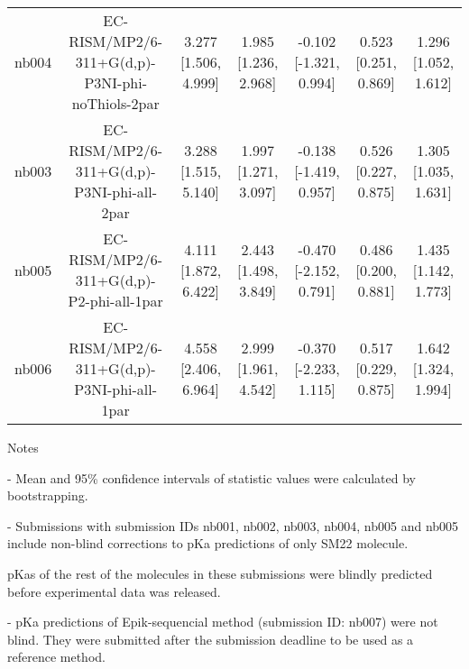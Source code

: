 \documentclass{article}
\begin{document}
\begin{center}
\begin{longtable}{|ccccccc|}
 nb004 &    EC-RISM/MP2/6-311+G(d,p)-P3NI-phi-noThiols-2par &  3.277 [1.506, 4.999] &  1.985 [1.236, 2.968] &   -0.102 [-1.321, 0.994] &  0.523 [0.251, 0.869] &   1.296 [1.052, 1.612] \\
 nb003 &         EC-RISM/MP2/6-311+G(d,p)-P3NI-phi-all-2par &  3.288 [1.515, 5.140] &  1.997 [1.271, 3.097] &   -0.138 [-1.419, 0.957] &  0.526 [0.227, 0.875] &   1.305 [1.035, 1.631] \\
 nb005 &           EC-RISM/MP2/6-311+G(d,p)-P2-phi-all-1par &  4.111 [1.872, 6.422] &  2.443 [1.498, 3.849] &   -0.470 [-2.152, 0.791] &  0.486 [0.200, 0.881] &   1.435 [1.142, 1.773] \\
 nb006 &         EC-RISM/MP2/6-311+G(d,p)-P3NI-phi-all-1par &  4.558 [2.406, 6.964] &  2.999 [1.961, 4.542] &   -0.370 [-2.233, 1.115] &  0.517 [0.229, 0.875] &   1.642 [1.324, 1.994] \\
\end{longtable}
\end{center}

Notes

- Mean and 95\% confidence intervals of statistic values were calculated by bootstrapping.

- Submissions with submission IDs nb001, nb002, nb003, nb004, nb005 and nb005 include non-blind corrections to pKa predictions of only SM22 molecule.

pKas of the rest of the molecules in these submissions were blindly predicted before experimental data was released.

- pKa predictions of Epik-sequencial method (submission ID: nb007) were not blind. They were submitted after the submission deadline to be used as a reference method.
\end{document}
